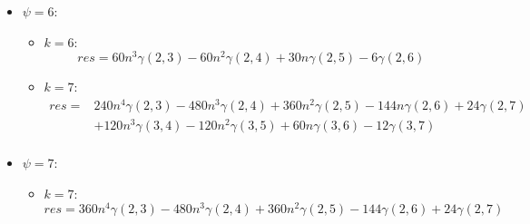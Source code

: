 \documentclass{article}
\begin{document}
\begin{itemize}
\begin{itemize}[label=$\circ$]
	\item $k=6$:
        \[
        \begin{aligned}
        res = &36n^3\gamma(2,3) - 60n^2\gamma(2,4) + 30n\gamma(2,5) - 6\gamma(2,6)\\
        & + 24n^2\gamma(3,4) - 16n\gamma(3,5) + 4\gamma(3,6)
        \end{aligned}
        \]
        
        \item $k=7$:
        \[
        \begin{aligned}
        res = &144n^4\gamma(2,3) - 384n^3\gamma(2,4) + 360n^2\gamma(2,5) - 144n\gamma(2,6) + 24\gamma(2,7)\\
        &+ 144n^3\gamma(3,4) - 240n^2\gamma(3,5) + 120n\gamma(3,6) - 24\gamma(3,7)\\
        &+ 72n^2\gamma(4,5) - 48n\gamma(4,6) + 12\gamma(4,7)\\
        \end{aligned}
        \]
        
        \item $k=8$:
        \[
        \begin{aligned}
        res = &720n^5\gamma(2,3) - 2640n^4\gamma(2,4) + 3720n^3\gamma(2,5) - 2520n^2\gamma(2,6) + 840n\gamma(2,7) - 120\gamma(2,8)\\
        &+ 864n^4\gamma(3,4) - 2304n^3\gamma(3,5) + 2160n^2\gamma(3,6) - 864n\gamma(3,7) + 144\gamma(3,8)\\
        &+ 648n^3\gamma(4,5) -1080n^2\gamma(4,6) + 540n\gamma(4,7) - 108\gamma(4,8)\\
        &+ 288n^2\gamma(5,6) - 192n\gamma(5,7) + 48\gamma(5,8)
        \end{aligned}
        \]
    \end{itemize}
    
    \item $\psi = 6$:
    \begin{itemize}[label=$\circ$]
    	\item $k=6$:
	\[
	res = 60n^3\gamma(2,3) - 60n^2\gamma(2,4) + 30n\gamma(2,5) - 6\gamma(2,6)
	\]
	
	 \item $k=7$:
        \[
        \begin{aligned}
        res = &240n^4\gamma(2,3) - 480n^3\gamma(2,4) + 360n^2\gamma(2,5) - 144n\gamma(2,6) + 24\gamma(2,7)\\
        &+ 120n^3\gamma(3,4) - 120n^2\gamma(3,5) + 60n\gamma(3,6) - 12\gamma(3,7)\\
        \end{aligned}
        \]
    \end{itemize}
        
    \item $\psi = 7$:
    \begin{itemize}[label=$\circ$]
    	\item $k = 7$:
	\[
	res = 360n^4\gamma(2,3) - 480n^3\gamma(2,4) + 360n^2\gamma(2,5) - 144\gamma(2,6) + 24\gamma(2,7)
	\]
    \end{itemize}
\end{itemize}
\end{document}
